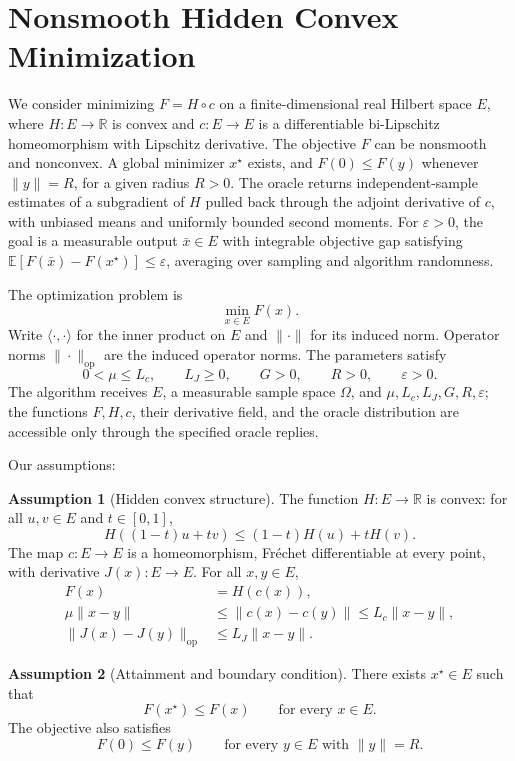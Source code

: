 \documentclass[10pt]{article}
\theoremstyle{definition}
\newtheorem{assumption}{Assumption}
\begin{document}
\section*{Nonsmooth Hidden Convex Minimization}
We consider minimizing $F=H\circ c$ on a finite-dimensional real Hilbert space $E$, where $H:E\to\mathbb{R}$ is convex and $c:E\to E$ is a differentiable bi-Lipschitz homeomorphism with Lipschitz derivative. The objective $F$ can be nonsmooth and nonconvex. A global minimizer $x^\star$ exists, and $F(0)\leq F(y)$ whenever $\|y\|=R$, for a given radius $R>0$. The oracle returns independent-sample estimates of a subgradient of $H$ pulled back through the adjoint derivative of $c$, with unbiased means and uniformly bounded second moments. For $\varepsilon>0$, the goal is a measurable output $\bar{x}\in E$ with integrable objective gap satisfying $\mathbb{E}[F(\bar{x})-F(x^\star)]\leq\varepsilon$, averaging over sampling and algorithm randomness.

The optimization problem is
\[
\min_{x\in E} F(x).
\]
Write $\langle\cdot,\cdot\rangle$ for the inner product on $E$ and $\|\cdot\|$ for its induced norm. Operator norms $\|\cdot\|_{\mathrm{op}}$ are the induced operator norms. The parameters satisfy
\[
0<\mu\leq L_c,\qquad L_J\geq0,\qquad G>0,\qquad R>0,\qquad\varepsilon>0.
\]
The algorithm receives $E$, a measurable sample space $\Omega$, and $\mu,L_c,L_J,G,R,\varepsilon$; the functions $F,H,c$, their derivative field, and the oracle distribution are accessible only through the specified oracle replies.

Our assumptions:
\begin{assumption}[Hidden convex structure]
The function $H:E\to\mathbb{R}$ is convex: for all $u,v\in E$ and $t\in[0,1]$,
\[
H((1-t)u+tv)\leq(1-t)H(u)+tH(v).
\]
The map $c:E\to E$ is a homeomorphism, Fr\'echet differentiable at every point, with derivative $J(x):E\to E$. For all $x,y\in E$,
\[
\begin{aligned}
F(x)&=H(c(x)),\\
\mu\|x-y\|&\leq\|c(x)-c(y)\|\leq L_c\|x-y\|,\\
\|J(x)-J(y)\|_{\mathrm{op}}&\leq L_J\|x-y\|.
\end{aligned}
\]
\end{assumption}

\begin{assumption}[Attainment and boundary condition]
There exists $x^\star\in E$ such that
\[
F(x^\star)\leq F(x)\qquad\text{for every }x\in E.
\]
The objective also satisfies
\[
F(0)\leq F(y)\qquad\text{for every }y\in E\text{ with }\|y\|=R.
\]
\end{assumption}
\end{document}
